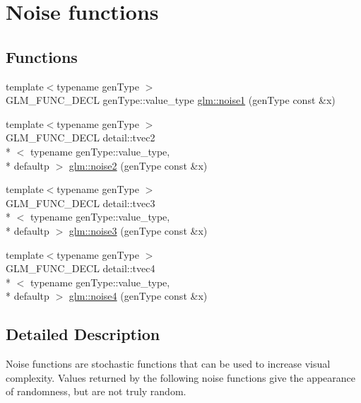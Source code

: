 \hypertarget{group__core__func__noise}{\section{Noise functions}
\label{group__core__func__noise}
}
\subsection*{Functions}
\begin{DoxyCompactItemize}
\item 
{\footnotesize template$<$typename gen\-Type $>$ }\\G\-L\-M\-\_\-\-F\-U\-N\-C\-\_\-\-D\-E\-C\-L gen\-Type\-::value\-\_\-type \hyperlink{group__core__func__noise_gadcbf14e3390990f33fda02bb20836960}{glm\-::noise1} (gen\-Type const \&x)
\item 
{\footnotesize template$<$typename gen\-Type $>$ }\\G\-L\-M\-\_\-\-F\-U\-N\-C\-\_\-\-D\-E\-C\-L detail\-::tvec2\\*
$<$ typename gen\-Type\-::value\-\_\-type, \\*
defaultp $>$ \hyperlink{group__core__func__noise_ga876ad0805cece7b52bac9f5bac42647a}{glm\-::noise2} (gen\-Type const \&x)
\item 
{\footnotesize template$<$typename gen\-Type $>$ }\\G\-L\-M\-\_\-\-F\-U\-N\-C\-\_\-\-D\-E\-C\-L detail\-::tvec3\\*
$<$ typename gen\-Type\-::value\-\_\-type, \\*
defaultp $>$ \hyperlink{group__core__func__noise_gadc066dd8e6c25b77a0dd4f59d4a2dd2c}{glm\-::noise3} (gen\-Type const \&x)
\item 
{\footnotesize template$<$typename gen\-Type $>$ }\\G\-L\-M\-\_\-\-F\-U\-N\-C\-\_\-\-D\-E\-C\-L detail\-::tvec4\\*
$<$ typename gen\-Type\-::value\-\_\-type, \\*
defaultp $>$ \hyperlink{group__core__func__noise_ga4ca7d36395a06c2f210ceca5d9a1d020}{glm\-::noise4} (gen\-Type const \&x)
\end{DoxyCompactItemize}


\subsection{Detailed Description}
Noise functions are stochastic functions that can be used to increase visual complexity. Values returned by the following noise functions give the appearance of randomness, but are not truly random. 

